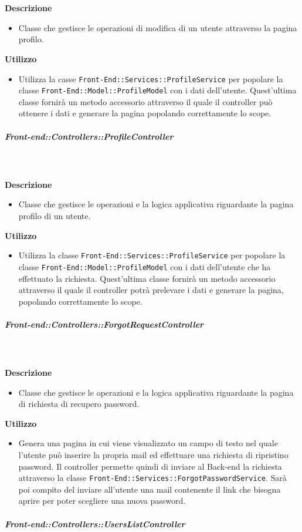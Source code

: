         \textbf{\\ \\ Descrizione} 
          \begin{itemize}
            \item[] Classe che gestisce le operazioni di modifica di un utente attraverso la pagina profilo.
          \end{itemize}      
        \textbf{Utilizzo}  
          \begin{itemize}
            \item[] Utilizza la casse \texttt{Front-End::Services::ProfileService} per popolare la classe \texttt{Front-End::Model::ProfileModel} con i dati dell'utente. Quest'ultima classe fornirà un metodo accessorio attraverso il quale il controller può ottenere i dati e generare la pagina popolando correttamente lo scope.
          \end{itemize}
      \subparagraph{Front-end::Controllers::ProfileController}
        
        \textbf{\\ \\ Descrizione} 
          \begin{itemize}
            \item[] Classe che gestisce le operazioni e la logica applicativa riguardante la pagina profilo di un utente.
          \end{itemize}      
        \textbf{Utilizzo}  
          \begin{itemize}
            \item[] Utilizza la classe \texttt{Front-End::Services::ProfileService} per popolare la classe \texttt{Front-End::Model::ProfileModel} con i dati dell'utente che ha effettuato la richiesta. Quest'ultima classe fornirà un metodo accessorio attraverso il quale il controller potrà prelevare i dati e generare la pagina, popolando correttamente lo scope.
          \end{itemize}
      \subparagraph{Front-end::Controllers::ForgotRequestController}
        
        \textbf{\\ \\ Descrizione} 
          \begin{itemize}
            \item[] Classe che gestisce le operazioni e la logica applicativa riguardante la pagina di richiesta di recupero password.
          \end{itemize}      
        \textbf{Utilizzo}  
          \begin{itemize}
            \item[] Genera una pagina in cui viene visualizzato un campo di testo nel quale l'utente può inserire la propria mail ed effettuare una richiesta di ripristino password. Il controller permette quindi di inviare al Back-end la richiesta attraverso la classe \texttt{Front-End::Services::ForgotPasswordService}. Sarà poi compito del  inviare all'utente una mail contenente il link che bisogna aprire per poter scegliere una nuova password.
          \end{itemize}
      \subparagraph{Front-end::Controllers::UsersListController}
        
